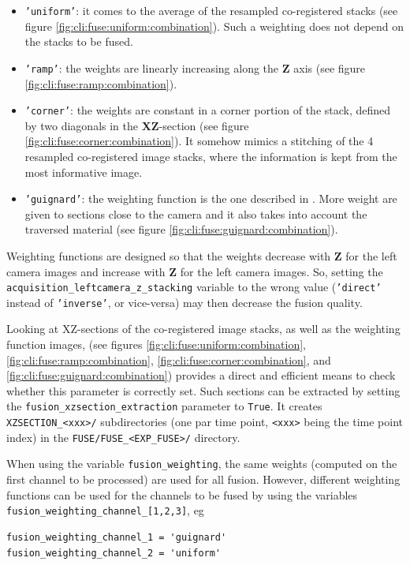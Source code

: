 \begin{itemize}
\item \texttt{'uniform'}:
it comes to the average of the resampled co-registered stacks (see figure \ref{fig:cli:fuse:uniform:combination}). Such a weighting does not depend on the stacks to be fused.
\item \texttt{'ramp'}:
the weights are linearly increasing along the \textbf{Z} axis (see figure \ref{fig:cli:fuse:ramp:combination}).
\item \texttt{'corner'}: the weights are constant in a corner portion of the stack, defined by two diagonals in the \textbf{XZ}-section (see figure \ref{fig:cli:fuse:corner:combination}). It somehow mimics a stitching of the 4 resampled co-registered image stacks, where the information is kept from the most informative image.
\item \texttt{'guignard'}: 
the weighting function is the one described in \cite{guignard:tel-01278725}.
More weight are given to sections close to the camera and it also takes into account the traversed material (see figure \ref{fig:cli:fuse:guignard:combination}). 
\end{itemize} 

Weighting functions are designed so that the weights decrease with \textbf{Z} for the left camera images and increase with \textbf{Z} for the left camera images. So, setting the \texttt{acquisition\_leftcamera\_z\_stacking} variable to the wrong value (\texttt{'direct'} instead of \texttt{'inverse'}, or vice-versa) may then decrease the fusion quality. 

Looking at XZ-sections of the co-registered image stacks, as well as the weighting function images, (see figures \ref{fig:cli:fuse:uniform:combination}, \ref{fig:cli:fuse:ramp:combination}, \ref{fig:cli:fuse:corner:combination}, and \ref{fig:cli:fuse:guignard:combination}) provides a direct and efficient means to check whether this parameter is correctly set. Such sections can be extracted by setting the \texttt{fusion\_xzsection\_extraction} parameter to \texttt{True}. It creates \texttt{XZSECTION\_<xxx>/} subdirectories (one par time point, \texttt{<xxx>} being the time point index) in the \texttt{FUSE/FUSE\_<EXP\_FUSE>/} directory.

\mbox{}
\mbox{}


When using the variable \texttt{fusion\_weighting}, the same weights (computed on the first channel to be processed) are used for all fusion. However, different weighting functions can be used for the channels to be fused by using the variables  \texttt{fusion\_weighting\_channel\_[1,2,3]}, eg
\begin{verbatim}
fusion_weighting_channel_1 = 'guignard'
fusion_weighting_channel_2 = 'uniform'
\end{verbatim}


